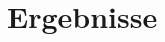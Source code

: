 \section{Ergebnisse}

\subsection{}
\subsubsection{}
\subsubsection{}
\subsubsection{}
\subsubsection{}
\subsubsection{}
\subsubsection{}
\subsubsection{}
\subsection{}
\subsubsection{}
